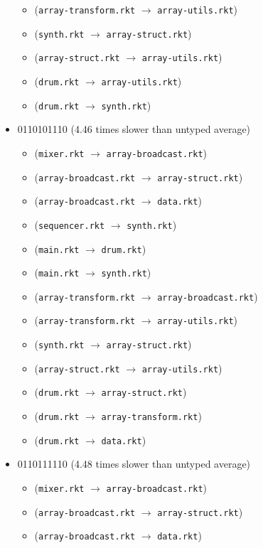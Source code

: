 \documentclass{article}
\newcommand{\mono}[1]{\texttt{#1}}
\begin{document}
\begin{itemize}
\begin{itemize}
  \item (\mono{array-transform.rkt} $\rightarrow$ \mono{array-utils.rkt})
  \item (\mono{synth.rkt} $\rightarrow$ \mono{array-struct.rkt})
  \item (\mono{array-struct.rkt} $\rightarrow$ \mono{array-utils.rkt})
  \item (\mono{drum.rkt} $\rightarrow$ \mono{array-utils.rkt})
  \item (\mono{drum.rkt} $\rightarrow$ \mono{synth.rkt})
  \end{itemize}
\item 0110101110 (4.46 times slower than untyped average)
  \begin{itemize}
  \item (\mono{mixer.rkt} $\rightarrow$ \mono{array-broadcast.rkt})
  \item (\mono{array-broadcast.rkt} $\rightarrow$ \mono{array-struct.rkt})
  \item (\mono{array-broadcast.rkt} $\rightarrow$ \mono{data.rkt})
  \item (\mono{sequencer.rkt} $\rightarrow$ \mono{synth.rkt})
  \item (\mono{main.rkt} $\rightarrow$ \mono{drum.rkt})
  \item (\mono{main.rkt} $\rightarrow$ \mono{synth.rkt})
  \item (\mono{array-transform.rkt} $\rightarrow$ \mono{array-broadcast.rkt})
  \item (\mono{array-transform.rkt} $\rightarrow$ \mono{array-utils.rkt})
  \item (\mono{synth.rkt} $\rightarrow$ \mono{array-struct.rkt})
  \item (\mono{array-struct.rkt} $\rightarrow$ \mono{array-utils.rkt})
  \item (\mono{drum.rkt} $\rightarrow$ \mono{array-struct.rkt})
  \item (\mono{drum.rkt} $\rightarrow$ \mono{array-transform.rkt})
  \item (\mono{drum.rkt} $\rightarrow$ \mono{data.rkt})
  \end{itemize}
\item 0110111110 (4.48 times slower than untyped average)
  \begin{itemize}
  \item (\mono{mixer.rkt} $\rightarrow$ \mono{array-broadcast.rkt})
  \item (\mono{array-broadcast.rkt} $\rightarrow$ \mono{array-struct.rkt})
  \item (\mono{array-broadcast.rkt} $\rightarrow$ \mono{data.rkt})

\end{itemize}
\end{itemize}
\end{document}
